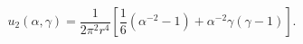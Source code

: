 \begin{equation}
u_2(\alpha, \gamma)=\frac1{2\pi^{2}r^{4}}\left[\frac16(\alpha^{-2}-1)+
\alpha^{-2}\gamma(\gamma-1)\right].
\label{52}
\end{equation}

